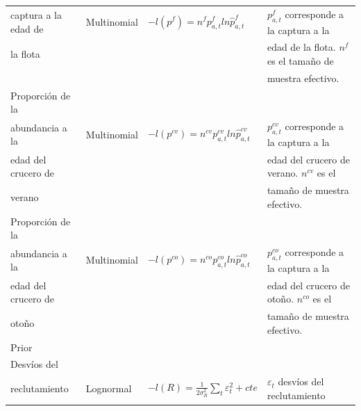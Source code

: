 \documentclass[
  spanish,
]{article}
\begin{document}
\begin{table}[h]
{\begin{tabular}{|l|l|l|l|}
captura a la edad de  & Multinomial &   $-l(p^f )=n^f p_{a,t}^f  ln \hat p_{a,t}^f$                                       & $p_{a,t}^f$ corresponde a la captura a la \\
la flota              &             &                                                                                   & edad de la flota. $n^f$ es el tamaño de \\
                      &             &                                                                                   & muestra efectivo.\\ \hline
Proporción de la      &             &                                                                                   & \\
abundancia a la       & Multinomial &   $-l(p^{cv} )=n^{cv} p_{a,t}^{cv}  ln \hat p_{a,t}^{cv}$                           & $p_{a,t}^{cv}$ corresponde a la captura a la \\
edad del crucero de   &             &                                                                                   & edad del crucero de verano. $n^{cv}$ es el \\
verano                &             &                                                                                   & tamaño de muestra efectivo.\\ \hline
Proporción de la      &             &                                                                                   & \\
abundancia a la       & Multinomial &   $-l(p^{co} )=n^{co} p_{a,t}^{co}  ln \hat p_{a,t}^{co}$                           & $p_{a,t}^{co}$ corresponde a la captura a la \\
edad del crucero de   &             &                                                                                   & edad del crucero de otoño. $n^{co}$ es el \\
otoño                 &             &                                                                                   & tamaño de muestra efectivo.\\ \hline
Prior                 &             &                                                                                   & \\ \hline
Desvíos del           &             &                                                                                   & \\
reclutamiento           & Lognormal   & $-l(R)=\frac{1}{2\sigma_R^2} \sum_t \varepsilon_t^2 +cte$                           & $\varepsilon_t$ desvíos del reclutamiento\\

\end{tabular}}
\end{table}
\end{document}

